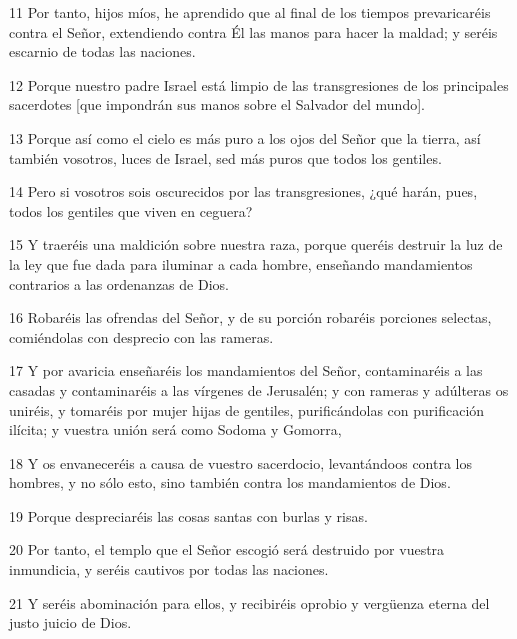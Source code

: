 \par 11 Por tanto, hijos míos, he aprendido que al final de los tiempos prevaricaréis contra el Señor, extendiendo contra Él las manos para hacer la maldad; y seréis escarnio de todas las naciones.

\par 12 Porque nuestro padre Israel está limpio de las transgresiones de los principales sacerdotes [que impondrán sus manos sobre el Salvador del mundo].

\par 13 Porque así como el cielo es más puro a los ojos del Señor que la tierra, así también vosotros, luces de Israel, sed más puros que todos los gentiles.

\par 14 Pero si vosotros sois oscurecidos por las transgresiones, ¿qué harán, pues, todos los gentiles que viven en ceguera?

\par 15 Y traeréis una maldición sobre nuestra raza, porque queréis destruir la luz de la ley que fue dada para iluminar a cada hombre, enseñando mandamientos contrarios a las ordenanzas de Dios.

\par 16 Robaréis las ofrendas del Señor, y de su porción robaréis porciones selectas, comiéndolas con desprecio con las rameras.

\par 17 Y por avaricia enseñaréis los mandamientos del Señor, contaminaréis a las casadas y contaminaréis a las vírgenes de Jerusalén; y con rameras y adúlteras os uniréis, y tomaréis por mujer hijas de gentiles, purificándolas con purificación ilícita; y vuestra unión será como Sodoma y Gomorra,

\par 18 Y os envaneceréis a causa de vuestro sacerdocio, levantándoos contra los hombres, y no sólo esto, sino también contra los mandamientos de Dios.

\par 19 Porque despreciaréis las cosas santas con burlas y risas.

\par 20 Por tanto, el templo que el Señor escogió será destruido por vuestra inmundicia, y seréis cautivos por todas las naciones.

\par 21 Y seréis abominación para ellos, y recibiréis oprobio y vergüenza eterna del justo juicio de Dios.


